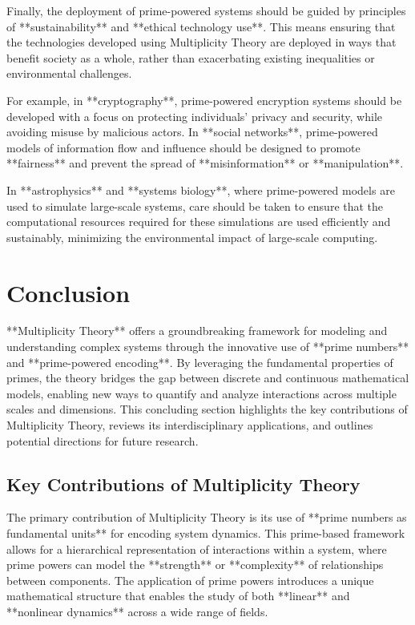 \documentclass[12pt]{article}
\begin{document}
Finally, the deployment of prime-powered systems should be guided by principles of **sustainability** and **ethical technology use**. This means ensuring that the technologies developed using Multiplicity Theory are deployed in ways that benefit society as a whole, rather than exacerbating existing inequalities or environmental challenges.

For example, in **cryptography**, prime-powered encryption systems should be developed with a focus on protecting individuals' privacy and security, while avoiding misuse by malicious actors. In **social networks**, prime-powered models of information flow and influence should be designed to promote **fairness** and prevent the spread of **misinformation** or **manipulation**.

In **astrophysics** and **systems biology**, where prime-powered models are used to simulate large-scale systems, care should be taken to ensure that the computational resources required for these simulations are used efficiently and sustainably, minimizing the environmental impact of large-scale computing.

\section{Conclusion}

**Multiplicity Theory** offers a groundbreaking framework for modeling and understanding complex systems through the innovative use of **prime numbers** and **prime-powered encoding**. By leveraging the fundamental properties of primes, the theory bridges the gap between discrete and continuous mathematical models, enabling new ways to quantify and analyze interactions across multiple scales and dimensions. This concluding section highlights the key contributions of Multiplicity Theory, reviews its interdisciplinary applications, and outlines potential directions for future research.

\subsection{Key Contributions of Multiplicity Theory}

The primary contribution of Multiplicity Theory is its use of **prime numbers as fundamental units** for encoding system dynamics. This prime-based framework allows for a hierarchical representation of interactions within a system, where prime powers can model the **strength** or **complexity** of relationships between components. The application of prime powers introduces a unique mathematical structure that enables the study of both **linear** and **nonlinear dynamics** across a wide range of fields.
\end{document}
